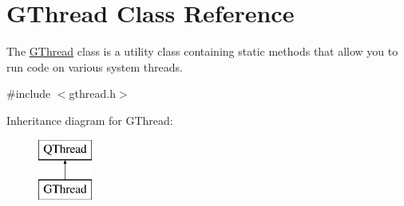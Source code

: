 \hypertarget{classGThread}{}\section{G\+Thread Class Reference}
\label{classGThread}


The \mbox{\hyperlink{classGThread}{G\+Thread}} class is a utility class containing static methods that allow you to run code on various system threads.  




{\ttfamily \#include $<$gthread.\+h$>$}

Inheritance diagram for G\+Thread\+:\begin{figure}[H]
\begin{center}
\leavevmode
\includegraphics[height=2.000000cm]{classGThread}
\end{center}
\end{figure}
